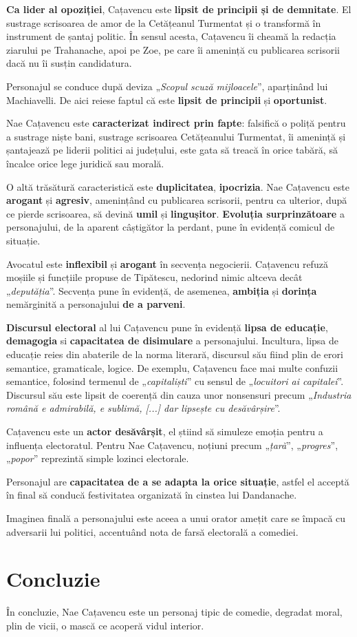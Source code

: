 \documentclass{article}
\newcommand{\qu}[1]{„\emph{#1}”}
\begin{document}
\textbf{Ca lider al opoziției}, Cațavencu este \textbf{lipsit de principii și de demnitate}. El sustrage scrisoarea de amor de la Cetățeanul Turmentat și o transformă în instrument de șantaj politic. În sensul acesta, Cațavencu îi cheamă la redacția ziarului pe Trahanache, apoi pe Zoe, pe care îi amenință cu publicarea scrisorii dacă nu îi susțin candidatura.

Personajul se conduce după deviza \qu{Scopul scuză mijloacele}, aparținând lui Machiavelli. De aici reiese faptul că este \textbf{lipsit de principii} și \textbf{oportunist}.

Nae Cațavencu este \textbf{caracterizat indirect prin fapte}: falsifică o poliță pentru a sustrage niște bani, sustrage scrisoarea Cetățeanului Turmentat, îi amenință și șantajează pe liderii politici ai județului, este gata să treacă în orice tabără, să încalce orice lege juridică sau morală.

O altă trăsătură caracteristică este \textbf{duplicitatea}, \textbf{ipocrizia}. Nae Cațavencu este \textbf{arogant} și \textbf{agresiv}, amenințând cu publicarea scrisorii, pentru ca ulterior, după ce pierde scrisoarea, să devină \textbf{umil} și \textbf{lingușitor}. \textbf{Evoluția surprinzătoare} a personajului, de la aparent câștigător la perdant, pune în evidență comicul de situație.

Avocatul este \textbf{inflexibil} și \textbf{arogant} în secvența negocierii. Cațavencu refuză moșiile și funcțiile propuse de Tipătescu, nedorind nimic altceva decât \qu{deputăția}. Secvența pune în evidență, de asemenea, \textbf{ambiția} și \textbf{dorința} nemărginită a personajului \textbf{de a parveni}.

\textbf{Discursul electoral} al lui Cațavencu pune în evidență \textbf{lipsa de educație}, \textbf{demagogia} si \textbf{capacitatea de disimulare} a personajului. Incultura, lipsa de educație reies din abaterile de la norma literară, discursul său fiind plin de erori semantice, gramaticale, logice. De exemplu, Cațavencu face mai multe confuzii semantice, folosind termenul de \qu{capitaliști} cu sensul de \qu{locuitori ai capitalei}. Discursul său este lipsit de coerență din cauza unor nonsensuri precum \qu{Industria română e admirabilă, e sublimă, [...] dar lipsește cu desăvârșire}.

Cațavencu este un \textbf{actor desăvârșit}, el știind să simuleze emoția pentru a influența electoratul. Pentru Nae Cațavencu, noțiuni precum \qu{țară}, \qu{progres}, \qu{popor} reprezintă simple lozinci electorale.

Personajul are \textbf{capacitatea de a se adapta la orice situație}, astfel el acceptă în final să conducă festivitatea organizată în cinstea lui Dandanache.

Imaginea finală a personajului este aceea a unui orator amețit care se împacă cu adversarii lui politici, accentuând nota de farsă electorală a comediei. 
\section{Concluzie}
În concluzie, Nae Cațavencu este un personaj tipic de comedie, degradat moral, plin de vicii, o mască ce acoperă vidul interior.
\end{document}
